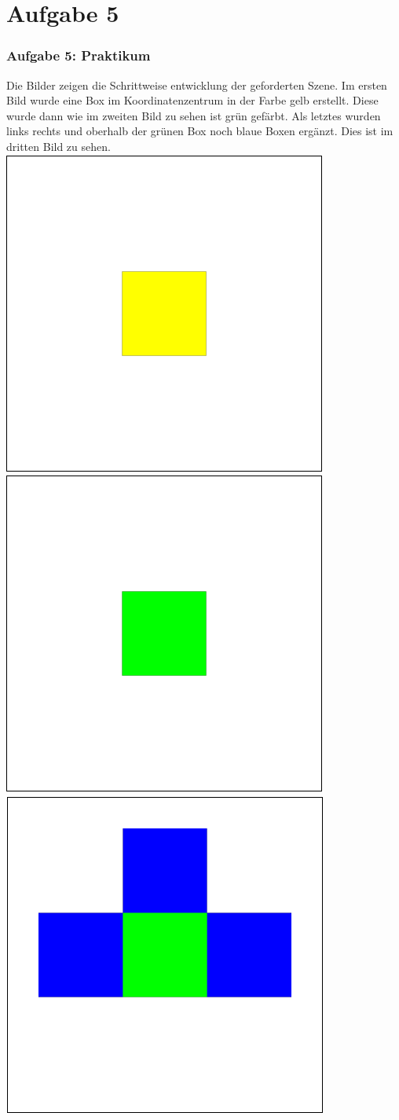 \documentclass[accentcolor=tud9c,colorbacktitle,inverttitle,landscape,german,presentation,t]{tudbeamer}
\begin{document}
\section{Aufgabe 5}
\begin{frame}
	\frametitle{Aufgabe 5: Praktikum}
	Die Bilder zeigen die Schrittweise entwicklung der geforderten Szene. Im ersten Bild wurde eine Box im Koordinatenzentrum in der Farbe gelb erstellt. Diese wurde dann wie im zweiten Bild zu sehen ist grün gefärbt. Als letztes wurden links rechts und oberhalb der grünen Box noch blaue Boxen ergänzt. Dies ist im dritten Bild zu sehen.\\
	
	\centering
	\includegraphics[width=0.25\linewidth]{task5_1.png}
	\includegraphics[width=0.25\linewidth]{task5_2.png}
	\includegraphics[width=0.25\linewidth]{task5_3.png}

	

\end{frame}
\end{document}
